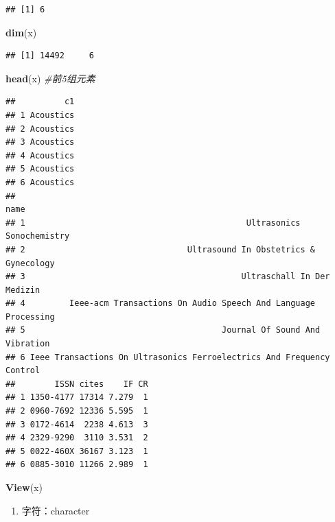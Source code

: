 \documentclass[]{scrbook}
\newenvironment{Shaded}{\begin{snugshade}}{\end{snugshade}}
\newcommand{\CommentTok}[1]{\textcolor[rgb]{0.56,0.35,0.01}{\textit{#1}}}
\newcommand{\DecValTok}[1]{\textcolor[rgb]{0.00,0.00,0.81}{#1}}
\newcommand{\KeywordTok}[1]{\textcolor[rgb]{0.13,0.29,0.53}{\textbf{#1}}}
\newcommand{\NormalTok}[1]{#1}
\newcommand{\OperatorTok}[1]{\textcolor[rgb]{0.81,0.36,0.00}{\textbf{#1}}}
\providecommand{\tightlist}{%
  \setlength{\itemsep}{0pt}\setlength{\parskip}{0pt}}
\begin{document}
\begin{verbatim}
## [1] 6
\end{verbatim}

\begin{Shaded}
\begin{Highlighting}[]
\KeywordTok{dim}\NormalTok{(x)}
\end{Highlighting}
\end{Shaded}

\begin{verbatim}
## [1] 14492     6
\end{verbatim}

\begin{Shaded}
\begin{Highlighting}[]
\KeywordTok{head}\NormalTok{(x) }\CommentTok{\#前5组元素}
\end{Highlighting}
\end{Shaded}

\begin{verbatim}
##          c1
## 1 Acoustics
## 2 Acoustics
## 3 Acoustics
## 4 Acoustics
## 5 Acoustics
## 6 Acoustics
##                                                                    name
## 1                                             Ultrasonics Sonochemistry
## 2                                 Ultrasound In Obstetrics & Gynecology
## 3                                            Ultraschall In Der Medizin
## 4         Ieee-acm Transactions On Audio Speech And Language Processing
## 5                                        Journal Of Sound And Vibration
## 6 Ieee Transactions On Ultrasonics Ferroelectrics And Frequency Control
##        ISSN cites    IF CR
## 1 1350-4177 17314 7.279  1
## 2 0960-7692 12336 5.595  1
## 3 0172-4614  2238 4.613  3
## 4 2329-9290  3110 3.531  2
## 5 0022-460X 36167 3.123  1
## 6 0885-3010 11266 2.989  1
\end{verbatim}

\begin{Shaded}
\begin{Highlighting}[]
\KeywordTok{View}\NormalTok{(x)}
\end{Highlighting}
\end{Shaded}

\begin{enumerate}
\def\labelenumi{\arabic{enumi}.}
\tightlist
\item
  字符：character
\end{enumerate}

\begin{Shaded}
\end{Shaded}
\end{document}
